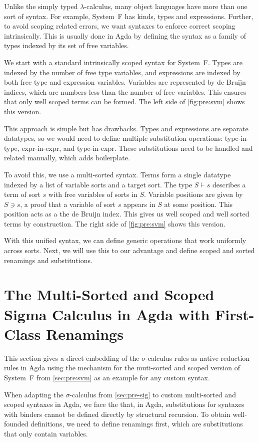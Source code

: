 \documentclass[screen,nonacm]{acmart}
\begin{document}
Unlike the simply typed $\lambda$-calculus, many object languages have more
than one sort of syntax. For example, System~F has kinds, types and
expressions. Further, to avoid scoping related errors, we want syntaxes to
enforce correct scoping intrinsically. This is usually done in Agda by defining
the syntax as a family of types indexed by its set of free variables.

We start with a standard intrinsically scoped syntax for System~F. Types are
indexed by the number of free type variables, and expressions are indexed by
both free type and expression variables. Variables are represented by de Bruijn
indices, which are numbers less than the number of free variables. This ensures
that only well scoped terms can be formed. The left side of \cref{fig:pre:svm}
shows this version.

This approach is simple but has drawbacks. Types and expressions are separate
datatypes, so we would need to define multiple substitution operations:
type-in-type, expr-in-expr, and type-in-expr. These substitutions need to be
handled and related manually, which adds boilerplate.

To avoid this, we use a multi-sorted syntax. Terms form a single datatype
indexed by a list of variable sorts and a target sort. The type $S \vdash s$
describes a term of sort $s$ with free variables of sorts in $S$. Variable
positions are given by $S \ni s$, a proof that a variable of sort $s$ appears
in $S$ at some position. This position acts as a the de Bruijn index. This
gives us well scoped and well sorted terms by construction. The right side of
\cref{fig:pre:svm} shows this version.

With this unified syntax, we can define generic operations that work uniformly
across sorts. Next, we will use this to our advantage and define scoped and
sorted renamings and substitutions.

\section{The Multi-Sorted and Scoped Sigma Calculus in Agda with First-Class Renamings}\label{sec:mis}

This section gives a direct embedding of the $\sigma$-calculus rules as native
reduction rules in Agda using the  mechanism for the
muti-sorted and scoped version of System~F from \cref{sec:pre:svm} as an
example for any custom syntax.

When adapting the $\sigma$-calculus from \cref{sec:pre-sig} to custom
multi-sorted and scoped syntaxes in Agda, we face the that, in Agda,
substitutions for syntaxes with binders cannot be defined directly by
structural recursion. To obtain well-founded definitions, we need to define
renamings first, which are substitutions that only contain variables.
\end{document}
